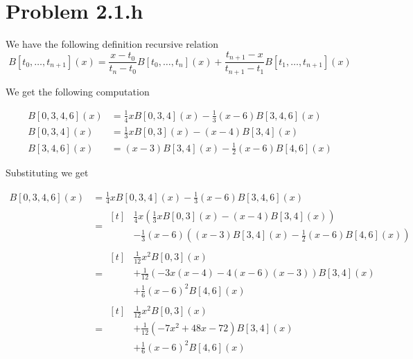 \documentclass{article}
\begin{document}
\section*{Problem 2.1.h}

We have the following definition recursive relation
\begin{equation*}
    B[t_0,\ldots, t_{n + 1}](x)
    =\frac {x - t_0}{t_n - t_0}B[t_0,\ldots,t_n](x)
    +\frac {t_{n + 1} - x}{t_{n + 1} - t_1} B[t_1,\ldots,t_{n + 1}](x)
\end{equation*}

We get the following computation

\begin{equation*}
\begin{aligned}
    B[0,3,4,6](x)
    &= \frac 1 4 x B[0,3,4](x) - \frac 1 3 (x - 6) B[3,4,6](x)\\
    B[0,3,4](x)
    &= \frac 1 3 x B[0,3](x) - (x - 4) B[3,4](x)\\
    B[3,4,6](x)
    &= (x - 3) B[3,4](x) - \frac 1 2 (x - 6) B[4,6](x)
\end{aligned}
\end{equation*}

Substituting we get

\begin{equation*}
\begin{aligned}
    B[0,3,4,6](x)
    &= \frac 1 4 x B[0,3,4](x) - \frac 1 3 (x - 6) B[3,4,6](x)\\
    &=\begin{aligned}[t]
        &\frac 1 4 x \left(\frac 1 3 x B[0,3](x) - (x - 4) B[3,4](x)\right)\\
        &- \frac 1 3 (x - 6) \left((x - 3)B[3,4](x) - \frac 1 2 (x - 6) B[4,6](x)\right)
    \end{aligned}\\
    &=\begin{aligned}[t]
        &\frac 1 {12} x^2 B[0,3](x)\\
        &+ \frac 1 {12} \left(- 3x(x - 4) - 4(x - 6)(x - 3)\right)B[3,4](x)\\
        &+ \frac 1 6 (x - 6)^2 B[4,6](x)
    \end{aligned}\\
    &=\begin{aligned}[t]
        &\frac 1 {12} x^2 B[0,3](x)\\
        &+ \frac 1 {12} \left(-7x^2 + 48x - 72\right)B[3,4](x)\\
        &+ \frac 1 6 (x - 6)^2 B[4,6](x)
    \end{aligned}
\end{aligned}
\end{equation*}
\end{document}
